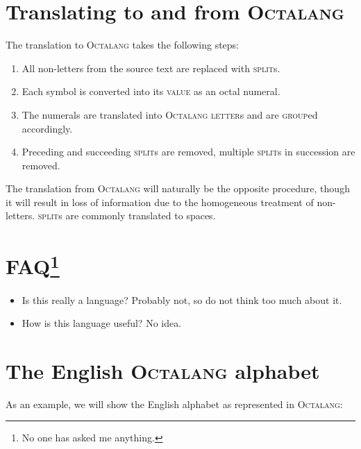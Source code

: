 \documentclass{article}
\newcommand{\octalang}[0]{\textsc{Octalang}}
\newcommand{\tvalue}[0]{\textsc{value}}
\newcommand{\tletter}[0]{\textsc{letter}}
\newcommand{\tgroup}[0]{\textsc{group}}
\newcommand{\tsplit}[0]{\textsc{split}}
\begin{document}
\section*{Translating to and from {\sffamily\octalang{}}}

The translation to \octalang{} takes the following steps:

\begin{enumerate}
  \item All non-letters from the source text are replaced with \tsplit{}s.
  \item Each symbol is converted into its \tvalue{} as an octal numeral.
  \item The numerals are translated into \octalang{} \tletter{}s and are \tgroup{}ed accordingly.
  \item Preceding and succeeding \tsplit{}s are removed, multiple \tsplit{}s in succession are removed.
\end{enumerate} 

The translation from \octalang{} will naturally be the opposite procedure, though it will result in loss of information due to the homogeneous treatment of non-letters. \tsplit{}s are commonly translated to spaces.

\section*{FAQ\protect\footnote{No one has asked me anything.}}

\begin{itemize}
  \item Is this really a language? Probably not, so do not think too much about it.
  \item How is this language useful? No idea.
\end{itemize}

\newpage
{}

\section*{The English {\sffamily\octalang{}} alphabet}

As an example, we will show the English alphabet as represented in \octalang{}:
\end{document}
